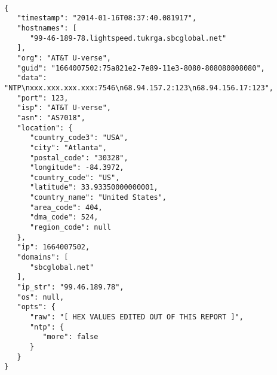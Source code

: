 \begin{lstlisting}

{
   "timestamp": "2014-01-16T08:37:40.081917",
   "hostnames": [
      "99-46-189-78.lightspeed.tukrga.sbcglobal.net"
   ],
   "org": "AT&T U-verse",
   "guid": "1664007502:75a821e2-7e89-11e3-8080-808080808080",
   "data": "NTP\nxxx.xxx.xxx.xxx:7546\n68.94.157.2:123\n68.94.156.17:123",
   "port": 123,
   "isp": "AT&T U-verse",
   "asn": "AS7018",
   "location": {
      "country_code3": "USA",
      "city": "Atlanta",
      "postal_code": "30328",
      "longitude": -84.3972,
      "country_code": "US",
      "latitude": 33.93350000000001,
      "country_name": "United States",
      "area_code": 404,
      "dma_code": 524,
      "region_code": null
   },
   "ip": 1664007502,
   "domains": [
      "sbcglobal.net"
   ],
   "ip_str": "99.46.189.78",
   "os": null,
   "opts": {
      "raw": "[ HEX VALUES EDITED OUT OF THIS REPORT ]",
      "ntp": {
         "more": false
      }
   }
}
\end{lstlisting}